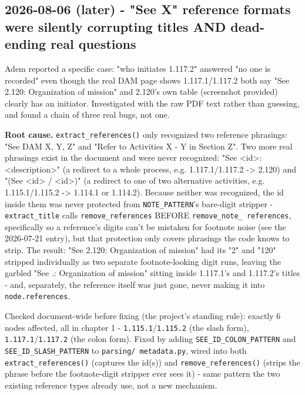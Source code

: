 \subsection*{2026-08-06 (later) - "See X" reference formats were silently corrupting titles AND dead-ending real questions}
Adem reported a specific case: "who initiates 1.117.2" answered "no one is recorded" even though the real DAM page shows 1.117.1/1.117.2 both say "See 2.120: Organization of mission" and 2.120's own table (screenshot provided) clearly has an initiator. Investigated with the raw PDF text rather than guessing, and found a chain of three real bugs, not one.

\textbf{Root cause.} \texttt{extract\_\allowbreak{}references()} only recognized two reference phrasings: "See DAM X, Y, Z" and "Refer to Activities X - Y in Section Z". Two more real phrasings exist in the document and were never recognized: "See <id>: <description>" (a redirect to a whole process, e.g. 1.117.1/1.117.2 -> 2.120) and "(See <id> / <id>)" (a redirect to one of two alternative activities, e.g. 1.115.1/1.115.2 -> 1.114.1 or 1.114.2). Because neither was recognized, the id inside them was never protected from \texttt{NOTE\_\allowbreak{}PATTERN}'s bare-digit stripper -\texttt{extract\_\allowbreak{}title} calls \texttt{remove\_\allowbreak{}references} BEFORE \texttt{remove\_\allowbreak{}note\_\allowbreak{} references}, specifically so a reference's digits can't be mistaken for footnote noise (see the 2026-07-21 entry), but that protection only covers phrasings the code knows to strip. The result: "See 2.120: Organization of mission" had its "2" and "120" stripped individually as two separate footnote-looking digit runs, leaving the garbled "See .: Organization of mission" sitting inside 1.117.1's and 1.117.2's titles - and, separately, the reference itself was just gone, never making it into \texttt{node.references}.

Checked document-wide before fixing (the project's standing rule): exactly 6 nodes affected, all in chapter 1 - \texttt{1.115.1}/\texttt{1.115.2} (the slash form), \texttt{1.117.1}/\texttt{1.117.2} (the colon form). Fixed by adding \texttt{SEE\_\allowbreak{}ID\_\allowbreak{}COLON\_\allowbreak{}PATTERN} and \texttt{SEE\_\allowbreak{}ID\_\allowbreak{}SLASH\_\allowbreak{}PATTERN} to \texttt{parsing/\allowbreak{} metadata.py}, wired into both \texttt{extract\_\allowbreak{}references()} (captures the id(s)) and \texttt{remove\_\allowbreak{}references()} (strips the phrase before the footnote-digit stripper ever sees it) - same pattern the two existing reference types already use, not a new mechanism.

